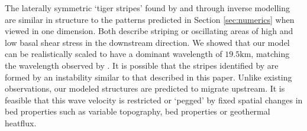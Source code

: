 \documentclass[journal abbreviation, manuscript]{copernicus}
\begin{document}



The laterally symmetric `tiger stripes' found by \citet{sergienko2013regular} and \citet{sergienko2014similarity} through inverse modelling are similar in structure to the patterns predicted in Section \ref{sec:numerics} when viewed in one dimension. Both describe striping or oscillating areas of high and low basal shear stress in the downstream direction.  We showed that our model can be realistically scaled to have a dominant wavelength of $19.5 \mathrm{km}$, matching the wavelength observed by \citet{sergienko2014similarity}. It is possible that the stripes identified by \citet{sergienko2014similarity} are formed by an instability similar to that described in this paper. Unlike existing observations, our modeled structures are predicted to migrate upstream. It is feasible that this wave velocity is restricted or `pegged' by fixed spatial changes in bed properties such as variable topography, bed properties or geothermal heatflux.  
\end{document}
